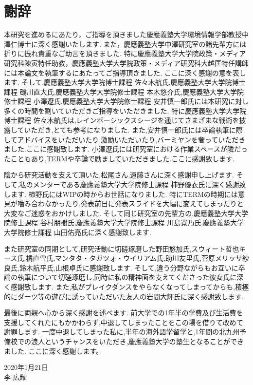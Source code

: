 \chapter*{謝辞}
本研究を進めるにあたり，ご指導を頂きました慶應義塾大学環境情報学部教授中澤仁博士に深く感謝いたします.
また，慶應義塾大学中澤研究室の諸先輩方には折りに振れ貴重なご助言を頂きました.
特に慶應義塾大学大学院政策・メディア研究科陳寅特任助教，慶應義塾大学大学院政策・メディア研究科大越匡特任講師には本論文を執筆するにあたってご指導頂きました.
ここに深く感謝の意を表します.
そして,慶應義塾大学大学院博士課程 佐々木航氏,慶應義塾大学大学院博士課程 磯川直大氏,慶應義塾大学大学院修士課程 本木悠介氏,慶應義塾大学大学院修士課程 小澤遼氏,慶應義塾大学大学院修士課程 安井慎一郎氏には本研究に対し多くの時間を割いていただきご指導をいただきました.
特に慶應義塾大学大学院博士課程 佐々木航氏は,レインボーシックスシージを通じてさまざまな戦術を披露していただき,とても参考になりました.
また,安井慎一郎氏には卒論執筆に際してアドバイスをいただいたり,激励いただいたり,バーミヤンを奢っていただきました.ここに感謝致します.
小澤遼氏には研究室における作業スペースが隣だったこともあり,TERMや卒論で励ましていただきました.ここに感謝致します.

陰から研究活動を支えて頂いた,松尾さん,遠藤さんに深く感謝申し上げます.
そして,私のメンターである慶應義塾大学大学院修士課程 柿野優衣氏に深く感謝致します.
柿野氏にはWIPの時からお世話になりました.
特にTERMの時期には意見が噛み合わなかったり,発表前日に発表スライドを大幅に変えてしまったりと大変なご迷惑をおかけしました.
そして同じ研究室の先輩方の,慶應義塾大学大学院修士課程 谷村朋樹氏,慶應義塾大学大学院修士課程 川島寛乃氏,慶應義塾大学大学院修士課程 山田佑亮氏に深く感謝致します.

また研究室の同期として,研究活動に切磋琢磨した野田悠加氏,スウィート哲也キース氏,橘直雪氏,マンタタ・タガツォ・ウイリアム氏,助川友里氏,菅原メリッサ紗良氏,鈴木航平氏,山根卓氏に感謝致します.
そして,違う分野ながらもお互いに卒論の執筆について切磋琢磨し,同時に私の精神面を支えてくださった彼女氏に深く感謝致します.
また,私がブレイクダンスをやらなくなってしまってからも,積極的にダーツ等の遊びに誘っていただいた友人の岩間大輝氏に深く感謝致します.

最後に両親へ心から深く感謝を述べます.
前大学での1年半の学費及び生活費を支援してくれたにもかかわらず,中退してしまったことをこの場を借りて改めて謝罪します.
一度中退してしまった私に,半年の海外語学留学と,1年間の北九州予備校での浪人というチャンスをいただき,慶應義塾大学の塾生となることができました.
ここに深く感謝します。

\begin{flushright}
2020年1月21日\\
李 広耀
\end{flushright}
